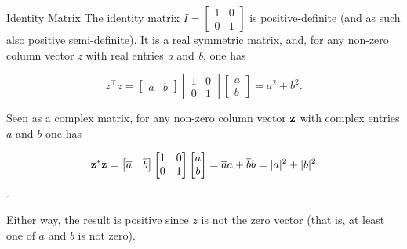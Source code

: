 %
%
%

\begin{example}{Identity Matrix}{}
\label{pd-example}
The \href{identity_matrix}{identity matrix}
\(I = \begin{bmatrix} 1 & 0 \\ 0 & 1 \end{bmatrix}\) is
positive-definite (and as such also positive semi-definite). It is a
real symmetric matrix, and, for any non-zero column vector \emph{z} with
real entries \emph{a} and \emph{b}, one has


\[z^\top  z = \begin{bmatrix} a & b \end{bmatrix} \begin{bmatrix} 1 & 0 \\ 0 & 1 \end{bmatrix} \begin{bmatrix} a \\ b \end{bmatrix} = a^2 + b^2.\]


Seen as a complex matrix, for any non-zero column vector $\mathbf{z}$ with
complex entries $a$ and $b$ one has


\[\mathbf{z}^*\mathbf{z} = \begin{bmatrix} \overline{a} & \overline{b} \end{bmatrix} \begin{bmatrix} 1 & 0 \\ 0 & 1 \end{bmatrix} \begin{bmatrix} a \\ b\end{bmatrix} = \overline{a}a + \overline{b}b = |a|^2 + |b|^2\].


Either way, the result is positive since \(z\) is not the zero vector
(that is, at least one of \(a\) and \(b\) is not zero). 
\end{example}

